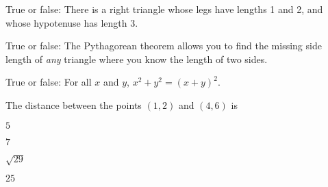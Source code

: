 \documentclass{../ximera}
\author{Claire Merriman}
\begin{document}
\maketitle

\begin{exercise}True or false:
 There is a right triangle whose legs have lengths 1 and 2, and whose hypotenuse has length 3.
\end{exercise}

\begin{exercise}True or false:
 The Pythagorean theorem allows you to find the missing side length of \emph{any} triangle where you know the length of two sides.
\end{exercise}

\begin{exercise}True or false:
 For all $x$ and $y$, $x^2+y^2=(x+y)^2$.
\end{exercise}

\begin{exercise}
The distance between the points
$(1,2)$ and $(4,6)$ is
\begin{enumerate}
\begin{multicols}{2}
 \item $5$
 \item $7$
 \item $\sqrt{29}$
 \item $25$
\end{multicols}
\end{enumerate}
\end{exercise}
\end{document}
